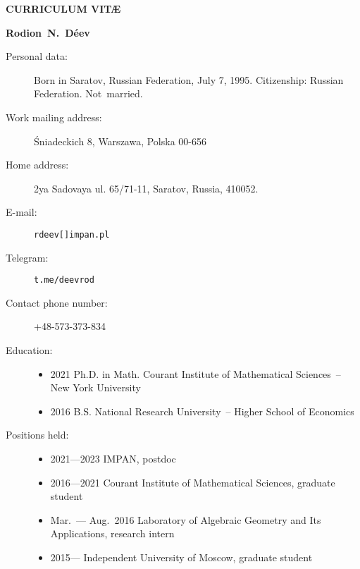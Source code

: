 \documentclass{article}
\begin{document}
\centerline{\bf\large CURRICULUM VIT\AE}

\vspace{3mm}

\centerline{\bf Rodion~N.~D\'eev}

\begin{description}

\item[Personal data:]  Born in Saratov, Russian Federation, July 7, 1995. 
Citizenship: Russian Federation. Not~married.

\item[Work mailing address:] \'Sniadeckich 8,  Warszawa,  Polska 00-656

\item[Home address:] 2ya Sadovaya ul. 65/71-11, Saratov, Russia,
410052.

\item[E-mail:] {\tt rdeev[]impan.pl}

\item[Telegram:] {\tt t.me/deevrod}

\item[Contact phone number:] +48-573-373-834

\item[Education:] \begin{itemize}
     \item 2021 \hspace{2mm} Ph.D. in Math. \hspace{2mm} Courant
     Institute of Mathematical Sciences~-- New York University
     \item 2016 \hspace{2mm} B.S. \hspace{2mm} National Research
     University~-- Higher School of Economics
\end{itemize}

\item[Positions held:] \begin{itemize}
     \item 2021---2023 \hspace{2mm} IMPAN,  postdoc
     \item 2016---2021 \hspace{2mm} Courant Institute of Mathematical Sciences,
     graduate student
     \item Mar.~--- Aug.~2016 \hspace{2mm} Laboratory of Algebraic Geometry
	and Its Applications, research intern
     \item 2015--- \hspace{2mm} Independent University of Moscow,
     graduate student
\end{itemize}


\end{description}
\end{document}
